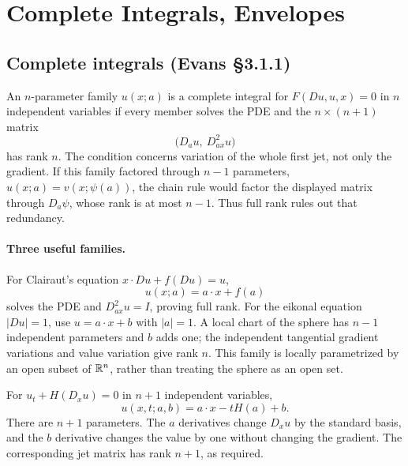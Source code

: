 \Needspace{65mm}
\section{Complete Integrals, Envelopes}
\label{sec:3-1}

\subsection{Complete integrals (Evans \S3.1.1)}
An $n$-parameter family $u(x;a)$ is a complete integral for
$F(Du,u,x)=0$ in $n$ independent variables if every member solves the
PDE and the $n\times(n+1)$ matrix
\[
 \bigl(D_a u,\ D^2_{ax}u\bigr)
\]
has rank $n$. The condition concerns variation of the whole first jet,
not only the gradient.
\Needspace{45mm}
If this family factored through $n-1$ parameters, $u(x;a)=v(x;\psi(a))$,
the chain rule would factor the displayed matrix through $D_a\psi$,
whose rank is at most $n-1$. Thus full rank rules out that redundancy.

\paragraph{Three useful families.}
For Clairaut's equation $x\cdot Du+f(Du)=u$,
\[
 u(x;a)=a\cdot x+f(a)
\]
solves the PDE and $D^2_{ax}u=I$, proving full rank.
For the eikonal equation $|Du|=1$, use $u=a\cdot x+b$ with $|a|=1$.
A local chart of the sphere has $n-1$ independent parameters and $b$
adds one; the independent tangential gradient variations and value
variation give rank $n$. This family is locally parametrized by an
open subset of $\mathbb{R}^n$, rather than treating the sphere as an open set.

For $u_t+H(D_xu)=0$ in $n+1$ independent variables,
\[
 u(x,t;a,b)=a\cdot x-tH(a)+b.
\]
There are $n+1$ parameters. The $a$ derivatives change $D_xu$ by the
standard basis, and the $b$ derivative changes the value by one
without changing the gradient. The corresponding jet matrix has
rank $n+1$, as required.

